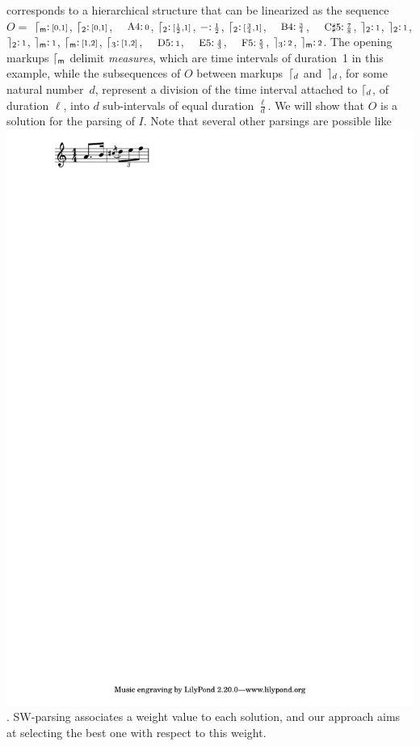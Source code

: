 \begin{example}
corresponds to a hierarchical structure
that can be linearized as the sequence
$O =$
$\lceil_{\mathsf{m}}\mathpunct{:}{\scriptstyle [0,1]}$,
$\lceil_{2}\mathpunct{:}{\scriptstyle [0,1]}$,
$\mbox{\footnotesize A4}\tstamp{0}$,
$\lceil_{2}\mathpunct{:}{\scriptstyle [\frac{1}{2},1]}$,
$-\mathpunct{:}{\scriptstyle \frac{1}{2}}$,
$\lceil_{2}\mathpunct{:}{\scriptstyle [\frac{3}{4},1]}$,
$\mbox{\footnotesize B4}\tstamp{\frac{3}{4}}$,
$\mbox{\footnotesize C$\sharp$5}\tstamp{\frac{7}{8}}$,
$\rceil_{2}\mathpunct{:}{\scriptstyle 1}$,
$\rceil_{2}\mathpunct{:}{\scriptstyle 1}$,
$\rceil_{2}\mathpunct{:}{\scriptstyle 1}$,
$\rceil_{\mathsf{m}}\mathpunct{:}{\scriptstyle 1}$,
$\lceil_{\mathsf{m}}\mathpunct{:}{\scriptstyle [1,2]}$,
$\lceil_{3}\mathpunct{:}{\scriptstyle [1,2]}$,
$\mbox{\footnotesize D5}\tstamp{1}$,
$\mbox{\footnotesize E5}\tstamp{\frac{4}{3}}$,
$\mbox{\footnotesize F5}\tstamp{\frac{5}{3}}$,
$\rceil_{3}\mathpunct{:}{\scriptstyle 2}$,
$\rceil_{\mathsf{m}}\mathpunct{:}{\scriptstyle 2}$.
The opening markups $\lceil_{\mathsf{m}}$ %
delimit \emph{measures},
which are time intervals of duration~1 in this example,
while the subsequences of $O$ between markups~$\lceil_{d}$ and~$\rceil_{d}$,
for some natural number~$d$,
represent a division of the time interval attached to $\lceil_{d}$,
of duration $\ell$,
into $d$ sub-intervals of equal duration $\frac{\ell}{d}$.
%
We will show that $O$ is a solution for the
parsing of $I$. Note that several other parsings are possible
like \eg \includegraphics[scale=0.35,trim=0 5mm 0 0]{pictures/ex2.pdf}.
SW-parsing associates a weight value
to each solution, and our approach
aims at selecting the best one with respect to this weight.
\endex
\end{example}
